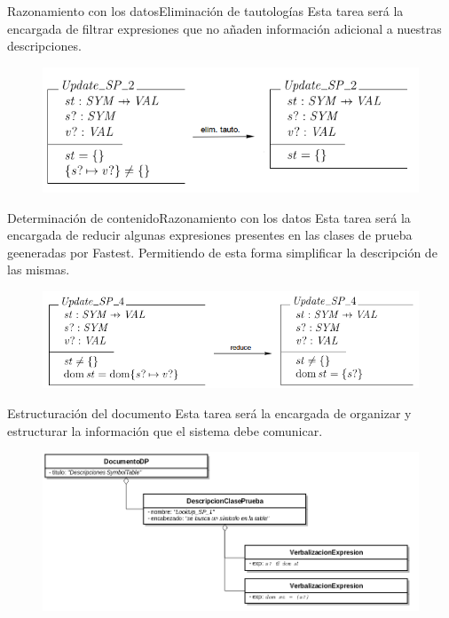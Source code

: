 \documentclass{beamer}
\begin{document}
      \begin{frame}{Razonamiento con los datos}{Eliminación de tautologías}
        Esta tarea será la encargada de filtrar expresiones que no añaden información adicional a nuestras descripciones.
        \begin{figure}[H]
          \centering
          \includegraphics[scale=0.4]{img/ej_elim_tauto.png}
        \end{figure}
      \end{frame}
                  										
      \begin{frame}{Determinación de contenido}{Razonamiento con los datos}
        Esta tarea será la encargada de reducir algunas expresiones presentes en las clases de prueba geeneradas por Fastest. Permitiendo de esta forma simplificar la descripción de las mismas.
        \begin{figure}[H]
          \centering
          \includegraphics[scale=0.4]{img/ej_reduce.png}
        \end{figure}
      \end{frame}
                  										
      \begin{frame}{Estructuración del documento}{}
        Esta tarea será la encargada de organizar y estructurar la información que el sistema debe comunicar.
        \begin{figure}[H]
          \centering
          \includegraphics[scale=0.3]{img/document_plan_ej.png}
        \end{figure}
      \end{frame}
                  										
\end{document}

